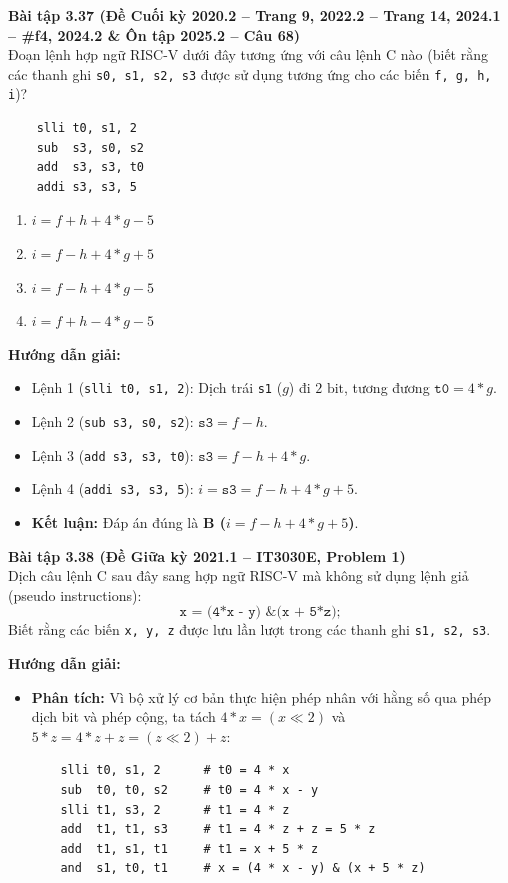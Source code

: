 \textbf{Bài tập 3.37 (Đề Cuối kỳ 2020.2 -- Trang 9, 2022.2 -- Trang 14, 2024.1 -- \#f4, 2024.2 \& Ôn tập 2025.2 -- Câu 68)}\\
Đoạn lệnh hợp ngữ RISC-V dưới đây tương ứng với câu lệnh C nào (biết rằng các thanh ghi \texttt{s0, s1, s2, s3} được sử dụng tương ứng cho các biến \texttt{f, g, h, i})?

\noindent\begin{minipage}{\linewidth}
\begin{lstlisting}
    slli t0, s1, 2
    sub  s3, s0, s2
    add  s3, s3, t0
    addi s3, s3, 5
\end{lstlisting}
\end{minipage}
\begin{enumerate}[label=\Alph*.]
    \item $i = f + h + 4 * g - 5$
    \item $i = f - h + 4 * g + 5$
    \item $i = f - h + 4 * g - 5$
    \item $i = f + h - 4 * g - 5$
\end{enumerate}
\textbf{Hướng dẫn giải:}
\begin{itemize}
    \item Lệnh 1 (\texttt{slli t0, s1, 2}): Dịch trái \texttt{s1} ($g$) đi $2\text{ bit}$, tương đương $\texttt{t0} = 4 * g$.
    \item Lệnh 2 (\texttt{sub s3, s0, s2}): $\texttt{s3} = f - h$.
    \item Lệnh 3 (\texttt{add s3, s3, t0}): $\texttt{s3} = f - h + 4 * g$.
    \item Lệnh 4 (\texttt{addi s3, s3, 5}): $i = \texttt{s3} = f - h + 4 * g + 5$.
    \item \textbf{Kết luận:} Đáp án đúng là \textbf{B ($i = f - h + 4 * g + 5$)}.
\end{itemize}

\textbf{Bài tập 3.38 (Đề Giữa kỳ 2021.1 -- IT3030E, Problem 1)}\\
Dịch câu lệnh C sau đây sang hợp ngữ RISC-V mà không sử dụng lệnh giả (pseudo instructions):
$$\texttt{x = (4*x - y) \& (x + 5*z);}$$
Biết rằng các biến \texttt{x, y, z} được lưu lần lượt trong các thanh ghi \texttt{s1, s2, s3}.

\textbf{Hướng dẫn giải:}
\begin{itemize}
    \item \textbf{Phân tích:} Vì bộ xử lý cơ bản thực hiện phép nhân với hằng số qua phép dịch bit và phép cộng, ta tách $4*x = (x \ll 2)$ và $5*z = 4*z + z = (z \ll 2) + z$:

\noindent\begin{minipage}{\linewidth}
\begin{lstlisting}
    slli t0, s1, 2      # t0 = 4 * x
    sub  t0, t0, s2     # t0 = 4 * x - y
    slli t1, s3, 2      # t1 = 4 * z
    add  t1, t1, s3     # t1 = 4 * z + z = 5 * z
    add  t1, s1, t1     # t1 = x + 5 * z
    and  s1, t0, t1     # x = (4 * x - y) & (x + 5 * z)
\end{lstlisting}
\end{minipage}
\end{itemize}

